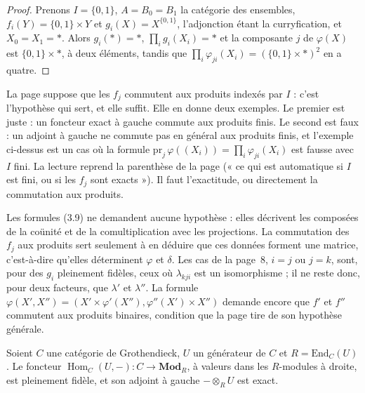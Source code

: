 \begin{proof}
Prenons $I = \{0, 1\}$, $A = B_0 = B_1$ la catégorie des ensembles, $f_i(Y) = \{0,1\} \times Y$ et $g_i(X) = X^{\{0,1\}}$, l'adjonction étant la curryfication, et $X_0 = X_1 = \ast$. Alors $g_i(\ast) = \ast$, $\prod_i g_i(X_i) = \ast$ et la composante $j$ de $\varphi(X)$ est $\{0,1\} \times \ast$, à deux éléments, tandis que $\prod_i \varphi_{ji}(X_i) = (\{0,1\} \times \ast)^2$ en a quatre.
\end{proof}

\begin{remarque}
La page suppose que les $f_j$ commutent aux produits indexés par $I$  : c'est l'hypothèse qui sert, et elle suffit. Elle en donne deux exemples. Le premier est juste : un foncteur exact à gauche commute aux produits finis. Le second est faux : un adjoint à gauche ne commute pas en général aux produits finis, et l'exemple ci-dessus est un cas où la formule $\mathrm{pr}_j\,\varphi((X_i)) = \prod_i \varphi_{ji}(X_i)$ est fausse avec $I$ fini. La lecture reprend la parenthèse de la page (« ce qui est automatique si $I$ est fini, ou si les $f_j$ sont exacts »). Il faut l'exactitude, ou directement la commutation aux produits.
\end{remarque}

\begin{remarque}
Les formules (3.9) ne demandent aucune hypothèse : elles décrivent les composées de la coünité et de la comultiplication avec les projections. La commutation des $f_j$ aux produits sert seulement à en déduire que ces données forment une matrice, c'est-à-dire qu'elles déterminent $\varphi$ et $\delta$. Les cas  de la page~8, $i = j$ ou $j = k$, sont, pour des $g_i$ pleinement fidèles, ceux où $\lambda_{kji}$ est un isomorphisme ; il ne reste donc, pour deux facteurs, que $\lambda'$ et $\lambda''$. La formule $\varphi(X', X'') = (X' \times \varphi'(X''), \varphi''(X') \times X'')$ demande encore que $f'$ et $f''$ commutent aux produits binaires, condition que la page tire de son hypothèse générale.
\end{remarque}

\begin{enonce}
Soient $C$ une catégorie de Grothendieck, $U$ un générateur de $C$ et $R = \mathrm{End}_C(U)$. Le foncteur $\operatorname{Hom}_C(U, -) : C \to \mathbf{Mod}_R$, à valeurs dans les $R$-modules à droite, est pleinement fidèle, et son adjoint à gauche $- \otimes_R U$ est exact.
\end{enonce}

